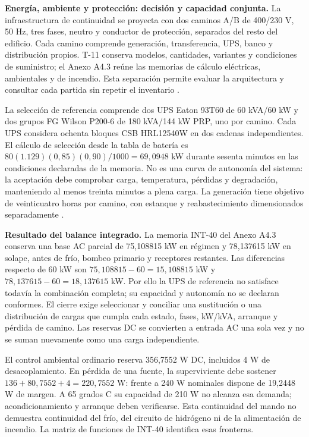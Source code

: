 \textbf{Energía, ambiente y protección: decisión y capacidad conjunta.}
La infraestructura de continuidad se proyecta con dos caminos A/B de 400/230 V, 50 Hz, tres fases, neutro y conductor de protección, separados del resto del edificio. Cada camino comprende generación, transferencia, UPS, banco y distribución propios. T-11 conserva modelos, cantidades, variantes y condiciones de suministro; el Anexo A4.3 reúne las memorias de cálculo eléctricas, ambientales y de incendio. Esta separación permite evaluar la arquitectura y consultar cada partida sin repetir el inventario \parencite[RT-06.06--19, pp.~15--16]{pucv-transversal}.

La selección de referencia comprende dos UPS Eaton 93T60 de 60 kVA/60 kW y dos grupos FG Wilson P200-6 de 180 kVA/144 kW PRP, uno por camino. Cada UPS considera ochenta bloques CSB HRL12540W en dos cadenas independientes. El cálculo de selección desde la tabla de batería es $80(1.129)(0,85)(0,90)/1000=69,0948$ kW durante sesenta minutos en las condiciones declaradas de la memoria. No es una curva de autonomía del sistema: la aceptación debe comprobar carga, temperatura, pérdidas y degradación, manteniendo al menos treinta minutos a plena carga. La generación tiene objetivo de veinticuatro horas por camino, con estanque y reabastecimiento dimensionados separadamente \parencites{p7-eaton-93t60,p7-fg-p200-ficha,csbHRL12540WRA260131}[RT-06.07/08, p.~15]{pucv-transversal}.

\textbf{Resultado del balance integrado.} La memoria INT-40 del Anexo A4.3 conserva una base AC parcial de 75,108815 kW en régimen y 78,137615 kW en solape, antes de frío, bombeo primario y receptores restantes. Las diferencias respecto de 60 kW son $75,108815-60=15,108815$ kW y $78,137615-60=18,137615$ kW. Por ello la UPS de referencia no satisface todavía la combinación completa; su capacidad y autonomía no se declaran conformes. El cierre exige seleccionar y conciliar una sustitución o una distribución de cargas que cumpla cada estado, fases, kW/kVA, arranque y pérdida de camino. Las reservas DC se convierten a entrada AC una sola vez y no se suman nuevamente como una carga independiente.

El control ambiental ordinario reserva 356,7552 W DC, incluidos 4 W de desacoplamiento. En pérdida de una fuente, la superviviente debe sostener $136+80,7552+4=220,7552$ W: frente a 240 W nominales dispone de 19,2448 W de margen. A 65 grados C su capacidad de 210 W no alcanza esa demanda; acondicionamiento y arranque deben verificarse. Esta continuidad del mando no demuestra continuidad del frío, del circuito de hidrógeno ni de la alimentación de incendio. La matriz de funciones de INT-40 identifica esas fronteras.

